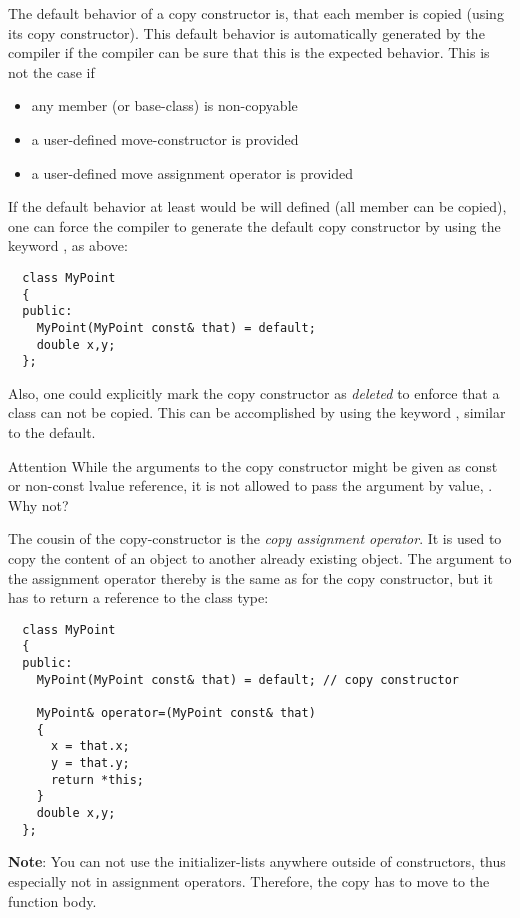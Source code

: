The default behavior of a copy constructor is, that each member is copied (using its copy constructor). This default behavior is automatically generated
by the compiler if the compiler can be sure that this is the expected behavior. This is not the case if
\begin{itemize}
  \item any member (or base-class) is non-copyable
  \item a user-defined move-constructor is provided
  \item a user-defined move assignment operator is provided
\end{itemize}

If the default behavior at least would be will defined (\ie all member can be copied), one can force the compiler to generate the default copy constructor
by using the keyword , as above:
%
\begin{verbatim}
  class MyPoint
  {
  public:
    MyPoint(MyPoint const& that) = default;
    double x,y;
  };
\end{verbatim}

Also, one could explicitly mark the copy constructor as \emph{deleted} to enforce that a class can not be copied. This can be accomplished by using the
keyword , similar to the default.

\begin{guideline}{Attention}
  While the arguments to the copy constructor might be given as const or non-const lvalue reference, it is not allowed to pass the argument by value, \eg
  . Why not?
\end{guideline}

The cousin of the copy-constructor is the \emph{copy assignment operator}. It is used to copy the content of an object to another already existing object.
The argument to the assignment operator thereby is the same as for the copy constructor, but it has to return a reference to the class type:
%
\begin{verbatim}
  class MyPoint
  {
  public:
    MyPoint(MyPoint const& that) = default; // copy constructor

    MyPoint& operator=(MyPoint const& that)
    {
      x = that.x;
      y = that.y;
      return *this;
    }
    double x,y;
  };
\end{verbatim}

\textbf{Note}: You can not use the initializer-lists anywhere outside of constructors, thus especially not in assignment operators. Therefore, the copy has to
move to the function body.

